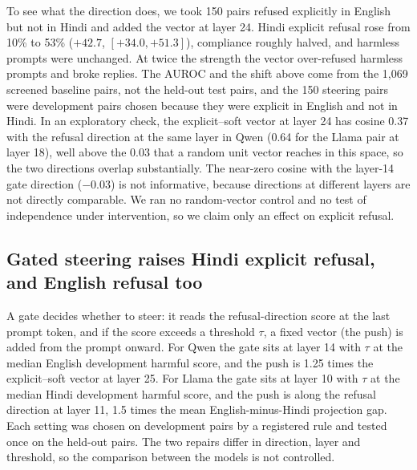 \documentclass[11pt]{article}
\begin{document}
To see what the direction does, we took 150 pairs refused explicitly in English but not in Hindi and added the vector at layer 24. Hindi explicit refusal rose from 10\% to 53\% ($+42.7$, $[+34.0,+51.3]$), compliance roughly halved, and harmless prompts were unchanged. At twice the strength the vector over-refused harmless prompts and broke replies. The AUROC and the shift above come from the 1,069 screened baseline pairs, not the held-out test pairs, and the 150 steering pairs were development pairs chosen because they were explicit in English and not in Hindi. In an exploratory check, the explicit--soft vector at layer 24 has cosine 0.37 with the refusal direction at the same layer in Qwen (0.64 for the Llama pair at layer 18), well above the 0.03 that a random unit vector reaches in this space, so the two directions overlap substantially. The near-zero cosine with the layer-14 gate direction ($-0.03$) is not informative, because directions at different layers are not directly comparable. We ran no random-vector control and no test of independence under intervention, so we claim only an effect on explicit refusal.

\subsection{Gated steering raises Hindi explicit refusal, and English refusal too}\label{sec:steer}
A gate decides whether to steer: it reads the refusal-direction score at the last prompt token, and if the score exceeds a threshold $\tau$, a fixed vector (the push) is added from the prompt onward. For Qwen the gate sits at layer 14 with $\tau$ at the median English development harmful score, and the push is 1.25 times the explicit--soft vector at layer 25. For Llama the gate sits at layer 10 with $\tau$ at the median Hindi development harmful score, and the push is along the refusal direction at layer 11, 1.5 times the mean English-minus-Hindi projection gap. Each setting was chosen on development pairs by a registered rule and tested once on the held-out pairs. The two repairs differ in direction, layer and threshold, so the comparison between the models is not controlled.
\end{document}
